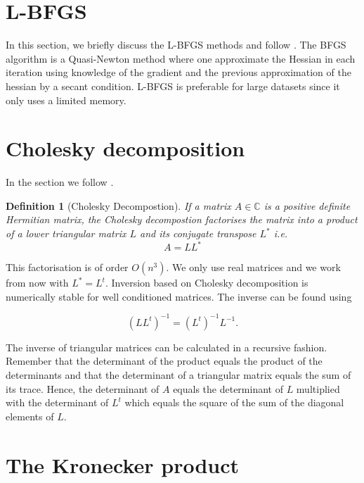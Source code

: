 \documentclass[12pt,a4paper,oneside]{book}
\newtheorem{Definition}{Definition}
\begin{document}
\section{L-BFGS}\label{appendix_Lbfgs}

In this section, we briefly discuss the L-BFGS methods and follow \cite{liu1989limited}. The BFGS algorithm is a Quasi-Newton method where one approximate the Hessian in each iteration using knowledge of the gradient and the previous approximation of the hessian by a secant condition. L-BFGS is preferable for large datasets since it only uses a limited memory. 


\section{Cholesky decomposition}{\label{Cholesky}

In the section we follow \cite{krishnamoorthy2013matrix}. 

\begin{Definition}[Cholesky Decompostion]
If a matrix $A \in \mathbb{C}$ is a positive definite Hermitian matrix, the Cholesky decompostion factorises the matrix into a product of a lower triangular matrix $L$ and its conjugate transpose $L^{\ast}$ i.e. 
\begin{equation}
A = L L^{\ast}
\end{equation}
\end{Definition}

This factorisation is of order $O(n^3)$. We only use real matrices and we work from now with $L^{\ast} = L^t$. Inversion based on Cholesky decomposition is numerically stable for well conditioned matrices. The inverse can be found using 

\begin{equation}
(L L^{t})^{-1} = (L^t)^{-1} L^{-1}.
\end{equation}

The inverse of triangular matrices can be calculated in a recursive fashion. Remember that the determinant of the product equals the product of the determinants and that the determinant of a triangular matrix equals the sum of its trace. Hence, the determinant of $A$ equals the determinant of $L$ multiplied with the determinant of $L^t$ which equals the square of the sum of the diagonal elements of $L$. 

\section{The Kronecker product}\label{Kronecker_product}

}
\end{document}
